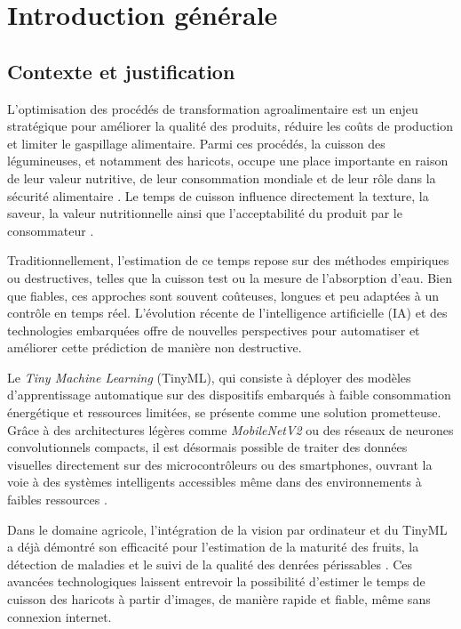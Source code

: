 \chapter{Introduction g\'en\'erale}

\section{Contexte et justification}
L’optimisation des procédés de transformation agroalimentaire est un enjeu stratégique pour améliorer la qualité des produits, réduire les coûts de production et limiter le gaspillage alimentaire. Parmi ces procédés, la cuisson des légumineuses, et notamment des haricots, occupe une place importante en raison de leur valeur nutritive, de leur consommation mondiale et de leur rôle dans la sécurité alimentaire \citep{mendoza2018}. Le temps de cuisson influence directement la texture, la saveur, la valeur nutritionnelle ainsi que l’acceptabilité du produit par le consommateur \citep{mbofung2012}.

Traditionnellement, l’estimation de ce temps repose sur des méthodes empiriques ou destructives, telles que la cuisson test ou la mesure de l’absorption d’eau. Bien que fiables, ces approches sont souvent coûteuses, longues et peu adaptées à un contrôle en temps réel. L’évolution récente de l’intelligence artificielle (IA) et des technologies embarquées offre de nouvelles perspectives pour automatiser et améliorer cette prédiction de manière non destructive.

Le \textit{Tiny Machine Learning} (TinyML), qui consiste à déployer des modèles d’apprentissage automatique sur des dispositifs embarqués à faible consommation énergétique et ressources limitées, se présente comme une solution prometteuse. Grâce à des architectures légères comme \textit{MobileNetV2} ou des réseaux de neurones convolutionnels compacts, il est désormais possible de traiter des données visuelles directement sur des microcontrôleurs ou des smartphones, ouvrant la voie à des systèmes intelligents accessibles même dans des environnements à faibles ressources \citep{banbury2021}.

Dans le domaine agricole, l’intégration de la vision par ordinateur et du TinyML a déjà démontré son efficacité pour l’estimation de la maturité des fruits, la détection de maladies et le suivi de la qualité des denrées périssables \citep{abdalla2023, tastan2023}. Ces avancées technologiques laissent entrevoir la possibilité d’estimer le temps de cuisson des haricots à partir d’images, de manière rapide et fiable, même sans connexion internet.

